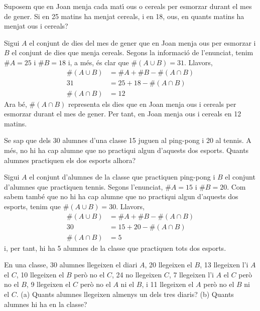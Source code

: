 \begin{exer}
Suposem que en Joan menja cada mat\'{\i} ous o cereals per esmorzar durant
el mes de gener. Si en 25 matins ha menjat cereals, i en 18, ous, en quants
matins ha menjat ous i cereals?
\end{exer}

\begin{solucio}
Sigui $A$ el conjunt de dies del mes de gener que en Joan menja ous per
esmorzar i $B$ el conjunt de dies que menja cereals. Segons la informaci\'{o}
de l'enunciat, tenim $\#A=25$ i $\#B=18$ i, a m\'{e}s, \'{e}s clar que $%
\#\left( A\cup B\right) =31$. Llavors,
\begin{align*}
\#\left( A\cup B\right) & =\#A+\#B-\#\left( A\cap B\right) \\
31& =25+18-\#\left( A\cap B\right) \\
\#\left( A\cap B\right) & =12
\end{align*}%
Ara b\'{e}, $\#\left( A\cap B\right) $ representa els dies que en Joan menja
ous i cereals per esmorzar durant el mes de gener. Per tant, en Joan menja
ous i cereals en 12 matins.
\end{solucio}

\begin{exer}
Se sap que dels 30 alumnes d'una classe 15 juguen al ping-pong i 20 al
tennis. A m\'{e}s, no hi ha cap alumne que no practiqui algun d'aquests dos
esports. Quants alumnes practiquen els dos esports alhora?
\end{exer}

\begin{solucio}
Sigui $A$ el conjunt d'alumnes de la classe que practiquen ping-pong i $B$
el conjunt d'alumnes que practiquen tennis. Segons l'enunciat, $\#A=15$ i $%
\#B=20$. Com sabem tamb\'{e} que no hi ha cap alumne que no practiqui algun
d'aquests dos esports, tenim que $\#\left( A\cup B\right) =30$. Llavors,%
\begin{align*}
\#\left( A\cup B\right) & =\#A+\#B-\#\left( A\cap B\right) \\
30& =15+20-\#\left( A\cap B\right) \\
\#\left( A\cap B\right) & =5
\end{align*}%
i, per tant, hi ha 5 alumnes de la classe que practiquen tots dos esports.
\end{solucio}

\begin{exer}
En una classe, 30 alumnes llegeixen el diari $A$, 20 llegeixen el $B$, 13
llegeixen l'i $A$ el $C$, 10 llegeixen el $B$ per\`{o} no el $C$, 24 no
llegeixen $C$, 7 llegeixen l'i $A$ el $C$ per\`{o} no el $B$, 9 llegeixen el
$C$ per\`{o} no el $A$ ni el $B$, i 11 llegeixen el $A$ per\`{o} no el $B$
ni el $C$. (a) Quants alumnes llegeixen almenys un dels tres diaris? (b)
Quants alumnes hi ha en la classe?
\end{exer}

